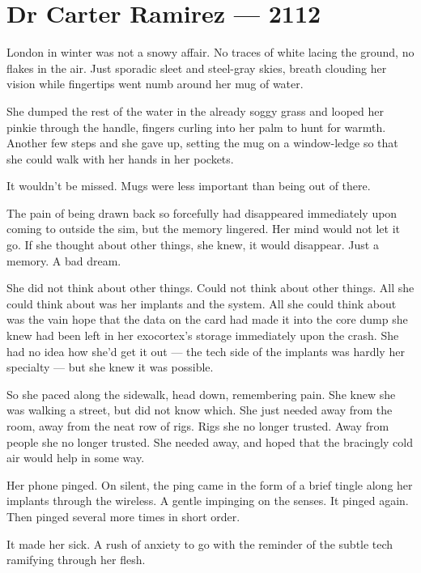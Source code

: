 \hypertarget{dr-carter-ramirez-2112}{%
\chapter*{Dr Carter Ramirez — 2112}\label{dr-carter-ramirez-2112}}

London in winter was not a snowy affair. No traces of white lacing the ground, no flakes in the air. Just sporadic sleet and steel-gray skies, breath clouding her vision while fingertips went numb around her mug of water.

She dumped the rest of the water in the already soggy grass and looped her pinkie through the handle, fingers curling into her palm to hunt for warmth. Another few steps and she gave up, setting the mug on a window-ledge so that she could walk with her hands in her pockets.

It wouldn't be missed. Mugs were less important than being out of there.

The pain of being drawn back so forcefully had disappeared immediately upon coming to outside the sim, but the memory lingered. Her mind would not let it go. If she thought about other things, she knew, it would disappear. Just a memory. A bad dream.

She did not think about other things. Could not think about other things. All she could think about was her implants and the system. All she could think about was the vain hope that the data on the card had made it into the core dump she knew had been left in her exocortex's storage immediately upon the crash. She had no idea how she'd get it out — the tech side of the implants was hardly her specialty — but she knew it was possible.

So she paced along the sidewalk, head down, remembering pain. She knew she was walking a street, but did not know which. She just needed away from the room, away from the neat row of rigs. Rigs she no longer trusted. Away from people she no longer trusted. She needed away, and hoped that the bracingly cold air would help in some way.

Her phone pinged. On silent, the ping came in the form of a brief tingle along her implants through the wireless. A gentle impinging on the senses. It pinged again. Then pinged several more times in short order.

It made her sick. A rush of anxiety to go with the reminder of the subtle tech ramifying through her flesh.

